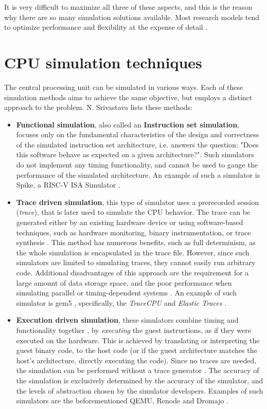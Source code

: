 It is very difficult to maximize all three of these aspects, and this is the reason why there are so many simulation
solutions available. Most research models tend to optimize performance and flexibility at the expense of detail
\cite{Simplescalar}.

\pagebreak
\section{CPU simulation techniques}

The central processing unit can be simulated in various ways. Each of these simulation methods aims to achieve the same
objective, but employs a distinct approach to the problem. N. Srivastava lists \cite{Nitish-Techniques} these methods:

\begin{itemize}
	\item{\textbf{Functional simulation}, also called an \textbf{Instruction set simulation}, focuses only on the
	fundamental characteristics of the design and correctness of the simulated instruction set architecture,
	i.e. answers the question: "Does this software behave as expected on a given architecture?". Such simulators do not implement any
	timing functionality, and cannot be used to gauge the performance of the simulated architecture. An example of such
	a simulator is Spike, a RISC-V ISA Simulator \cite{Spike}.}
	\item{\textbf{Trace driven simulation}, this type of simulator uses a prerecorded session (\textit{trace}), that is
	later used to simulate the CPU behavior. The trace can be generated either by an existing hardware device or
	using software-based techniques, such as hardware monitoring, binary instrumentation, or trace synthesis
	\cite{Simplescalar}. This method has numerous benefits, such as full determinism, as the whole simulation is
	encapsulated in the trace file. However, since such simulators are limited to simulating traces, they
	cannot easily run arbitrary code. Additional disadvantages of this approach are the requirement for a large
	amount of data storage space, and the poor performance when simulating parallel or timing-dependent systems
	\cite{TraceDrivenAccuracy}. An example of such simulator is gem5 \cite{gem5}, specifically, the \textit{TraceCPU}
	and \textit{Elastic Traces} \cite{gem5trace}.}
	\item{\textbf{Execution driven simulation}, these simulators combine timing and functionality together
	\cite{Nitish-Techniques}, by \textit{executing} the guest instructions, as if they were executed on the hardware.
	This is achieved by translating or interpreting the guest binary code, to the host code (or if the guest
	architecture matches the host's architecture, directly executing the code). Since no traces are needed, the
	simulation can be performed without a trace generator \cite{TraceDrivenAccuracy}.
	The accuracy of the simulation is exclusively determined by the accuracy of the simulator, and the levels of
	abstraction chosen by the simulator developers. Examples of such simulators are the beforementioned QEMU, Renode \cite{Renode} and
	Dromajo \cite{Dromajo}.}
\end{itemize}

